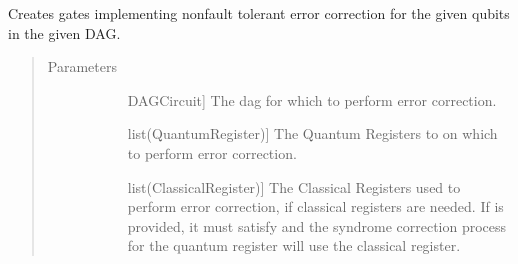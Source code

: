 \documentclass[letterpaper,10pt,english]{sphinxmanual}
\begin{document}
\begin{fulllineitems}
\begin{fulllineitems}
\label{\detokenize{Base:BaseFaultTolerance.ErrorCorrector.errorCorrectDag}}
\sphinxAtStartPar
Creates gates implementing non\sphinxhyphen{}fault tolerant error correction for the given qubits in the given DAG.
\begin{quote}\begin{description}
\item[{Parameters}] \leavevmode\begin{description}
\item[{}] \leavevmode{[}DAGCircuit{]}
\sphinxAtStartPar
The dag for which to perform error correction.

\item[{}] \leavevmode{[}list(QuantumRegister){]}
\sphinxAtStartPar
The Quantum Registers to on which to perform error correction.

\item[{}] \leavevmode{[}list(ClassicalRegister){]}
\sphinxAtStartPar
The Classical Registers used to perform error correction, if classical registers are needed. If  is provided, it must satisfy  and the syndrome correction process for the  quantum register will use the  classical register.

\end{description}

\end{description}\end{quote}

\end{fulllineitems}


\end{fulllineitems}

\end{document}
